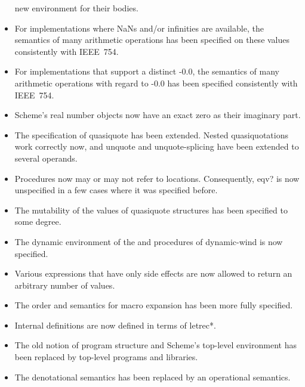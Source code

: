 \begin{itemize}
  new environment for their bodies.
\item For implementations where NaNs and/or infinities are available,
  the semantics of many arithmetic operations has been specified on
  these values consistently with IEEE~754.
\item For implementations that support a distinct -0.0, the semantics
  of many arithmetic operations with regard to -0.0 has been specified
  consistently with IEEE~754.
\item Scheme's real number objects now have an exact zero as their imaginary part.
\item The specification of {\cf quasiquote} has been extended.  Nested
  quasiquotations work correctly now, and {\cf unquote} and {\cf
    unquote-splicing} have been extended to several operands.
\item Procedures now may or may not refer to
  locations.  Consequently, {\cf eqv?} is now unspecified in a few
  cases where it was specified before.
\item The mutability of the values of {\cf quasiquote} structures has
  been specified to some degree.
\item The dynamic environment of the  and 
  procedures of {\cf dynamic-wind} is now specified.
\item Various expressions that have only side effects are now allowed
  to return an arbitrary number of values.
\item The order and semantics for macro expansion has been more fully
  specified.
\item Internal definitions are now defined in terms of {\cf letrec*}.
\item The old notion of program structure and Scheme's top-level
  environment has been replaced by top-level programs and libraries.
\item The denotational semantics has been replaced by an operational
  semantics.
\end{itemize}

